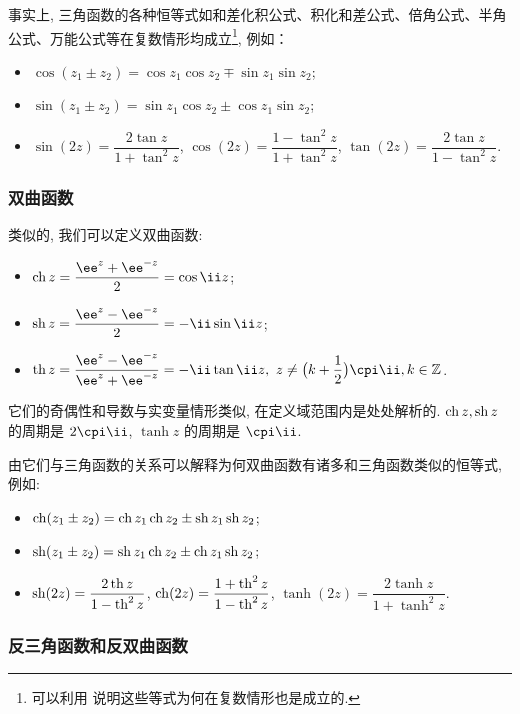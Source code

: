 事实上, 三角函数的各种恒等式如和差化积公式、积化和差公式、倍角公式、半角公式、万能公式等在复数情形均成立\footnote{%
  可以利用 说明这些等式为何在复数情形也是成立的.
}, 例如：

\begin{itemize}
  \item $\cos(z_1\pm z_2)=\cos z_1 \cos z_2\mp \sin z_1 \sin z_2$;
  \item $\sin(z_1\pm z_2)=\sin z_1 \cos z_2\pm\cos z_1 \sin z_2$;
  \item $\sin(2z)=\dfrac{2\tan z}{1+\tan^2 z}$, 
    $\cos(2z)=\dfrac{1-\tan^2 z}{1+\tan^2 z}$, 
    $\tan(2z)=\dfrac{2\tan z}{1-\tan^2 z}$.
\end{itemize}


\subsubsection{双曲函数}

类似的, 我们可以定义双曲函数:
\begin{itemize}
  \item {} $\ch z=\dfrac{\ee^z+\ee^{-z}}2=\cos \ii z$;
  \item {} $\sh z=\dfrac{\ee^z-\ee^{-z}}2=-\ii\sin \ii z$;
  \item {} $\tanh z=\dfrac{\ee^z-\ee^{-z}}{\ee^z+\ee^{-z}}=-\ii\tan \ii z,\ z\neq \bigl(k+\dfrac12\bigr)\cpi\ii, k\in\BZ$.
\end{itemize}

它们的奇偶性和导数与实变量情形类似, 在定义域范围内是处处解析的.
$\operatorname{ch} z,\operatorname{sh} z$ 的周期是 $2\cpi\ii$, $\tanh z$ 的周期是 $\cpi\ii$.

由它们与三角函数的关系可以解释为何双曲函数有诸多和三角函数类似的恒等式, 例如:

\begin{itemize}
  \item $\operatorname{ch}(z_1\pm z_2)=\operatorname{ch} z_1 \operatorname{ch} z_2\pm\operatorname{sh} z_1 \operatorname{sh} z_2$;
  \item $\operatorname{sh}(z_1\pm z_2)=\operatorname{sh} z_1 \operatorname{ch} z_2\pm\operatorname{ch} z_1 \operatorname{sh} z_2$;
  \item $\operatorname{sh}(2z)=\dfrac{2\operatorname{th} z}{1-\operatorname{th}^2 z}$, $\operatorname{ch}(2z)=\dfrac{1+\operatorname{th}^2 z}{1-\operatorname{th}^2 z}$, $\tanh(2z)=\dfrac{2\tanh z}{1+\tanh^2 z}$.
\end{itemize}


\subsubsection{反三角函数和反双曲函数}

